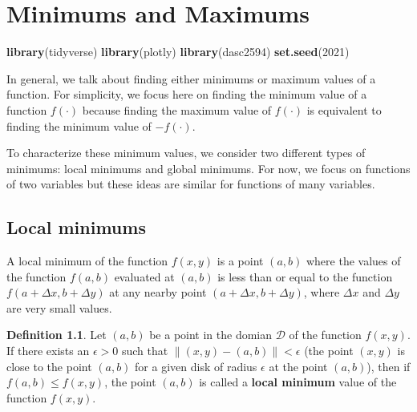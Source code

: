 \documentclass[
]{book}
\newenvironment{Shaded}{\begin{snugshade}}{\end{snugshade}}
\newcommand{\DecValTok}[1]{\textcolor[rgb]{0.00,0.00,0.81}{#1}}
\newcommand{\KeywordTok}[1]{\textcolor[rgb]{0.13,0.29,0.53}{\textbf{#1}}}
\newcommand{\NormalTok}[1]{#1}
\theoremstyle{definition}
\newtheorem{definition}{Definition}[chapter]
\theoremstyle{definition}
\theoremstyle{definition}
\theoremstyle{remark}
\begin{document}
\hypertarget{minimums-and-maximums}{%
\chapter{Minimums and Maximums}\label{minimums-and-maximums}}

\begin{Shaded}
\begin{Highlighting}[]
\KeywordTok{library}\NormalTok{(tidyverse)}
\KeywordTok{library}\NormalTok{(plotly)}
\KeywordTok{library}\NormalTok{(dasc2594)}
\KeywordTok{set.seed}\NormalTok{(}\DecValTok{2021}\NormalTok{)}
\end{Highlighting}
\end{Shaded}

In general, we talk about finding either minimums or maximum values of a function. For simplicity, we focus here on finding the minimum value of a function \(f(\cdot)\) because finding the maximum value of \(f(\cdot)\) is equivalent to finding the minimum value of \(-f(\cdot)\).

To characterize these minimum values, we consider two different types of minimums: local minimums and global minimums. For now, we focus on functions of two variables but these ideas are similar for functions of many variables.

\hypertarget{local-minimums}{%
\section{Local minimums}\label{local-minimums}}

A local minimum of the function \(f(x, y)\) is a point \((a, b)\) where the values of the function \(f(a, b)\) evaluated at \((a, b)\) is less than or equal to the function \(f(a + \Delta x, b + \Delta y)\) at any nearby point \((a + \Delta x, b + \Delta y)\), where \(\Delta x\) and \(\Delta y\) are very small values.

\begin{definition}
\protect\hypertarget{def:unnamed-chunk-300}{}{\label{def:unnamed-chunk-300} }Let \((a, b)\) be a point in the domian \(\mathcal{D}\) of the function \(f(x, y)\). If there exists an \(\epsilon > 0\) such that \(\|(x, y) - (a, b)\| < \epsilon\) (the point \((x, y)\) is close to the point \((a, b)\) for a given disk of radius \(\epsilon\) at the point \((a, b)\)), then if \(f(a, b) \leq f(x, y)\), the point \((a, b)\) is called a \textbf{local minimum} value of the function \(f(x, y)\).
\end{definition}
\end{document}
